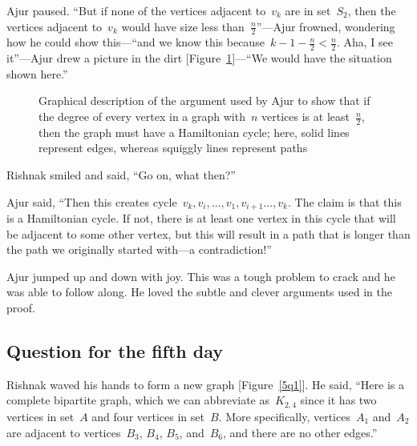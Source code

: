 Ajur paused. ``But if none of the vertices adjacent to~$v_k$ are in set~$S_2$, then the vertices adjacent to~$v_k$ would have size less than~$\frac{n}{2}$''---Ajur frowned, wondering how he could show this---``and we know this because~$k-1-\frac{n}{2}<\frac{n}{2}$. Aha, I see it''---Ajur drew a picture in the dirt [Figure~\ref{5g100}]---``We would have the situation shown here.''

\begin{figure}
\begin{center}
\caption{Graphical description of the argument used by Ajur to show that if the degree of every vertex in a graph with~$n$ vertices is at least~$\frac{n}{2}$, then the graph must have a Hamiltonian cycle; here, solid lines represent edges, whereas squiggly lines represent paths}\label{5g100}
\end{center}
\end{figure}
 
Rishnak smiled and said, ``Go on, what then?''

Ajur said, ``Then this creates cycle~$v_k,v_i,\ldots,v_1,v_{i+1}\ldots,v_k$. The claim is that this is a Hamiltonian cycle. If not, there is at least one vertex in this cycle that will be adjacent to some other vertex, but this will result in a path that is longer than the path we originally started with---a contradiction!''

Ajur jumped up and down with joy. This was a tough problem to crack and he was able to follow along. He loved the subtle and clever arguments used in the proof.

\subsection*{Question for the fifth day}
Rishnak waved his hands to form a new graph [Figure~\ref{5q1}]. He said, ``Here is a complete bipartite graph, which we can abbreviate as~$K_{2,4}$ since it has two vertices in set~$A$ and four vertices in set~$B$. More specifically, vertices~$A_1$ and~$A_2$ are adjacent to vertices~$B_3$, $B_4$, $B_5$, and~$B_6$, and there are no other edges.''

